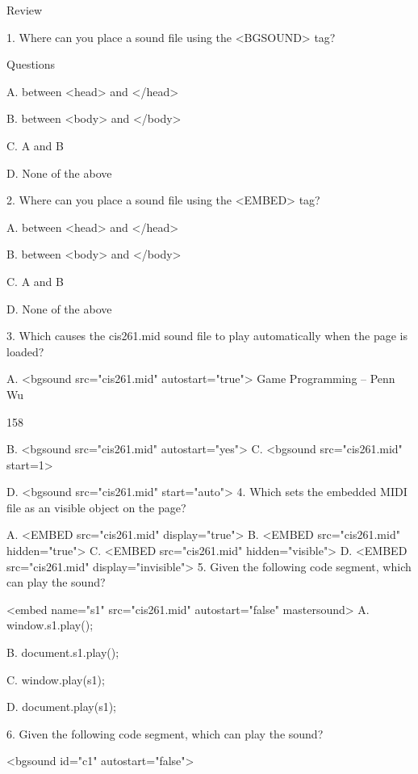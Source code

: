 \documentclass[
]{article}
\begin{document}
Review

1. Where can you place a sound file using the
\textless BGSOUND\textgreater{} tag?

Questions

A. between \textless head\textgreater{} and \textless/head\textgreater{}

B. between \textless body\textgreater{} and \textless/body\textgreater{}

C. A and B

D. None of the above

2. Where can you place a sound file using the
\textless EMBED\textgreater{} tag?

A. between \textless head\textgreater{} and \textless/head\textgreater{}

B. between \textless body\textgreater{} and \textless/body\textgreater{}

C. A and B

D. None of the above

3. Which causes the cis261.mid sound file to play automatically when the
page is loaded?

A. \textless bgsound src="cis261.mid" autostart="true"\textgreater{}
Game Programming -- Penn Wu

158

\protect\hypertarget{index_split_010.htmlux5cux23p159}{}{}B.
\textless bgsound src="cis261.mid" autostart="yes"\textgreater{} C.
\textless bgsound src="cis261.mid" start=1\textgreater{}

D. \textless bgsound src="cis261.mid" start="auto"\textgreater{} 4.
Which sets the embedded MIDI file as an visible object on the page?

A. \textless EMBED src="cis261.mid" display="true"\textgreater{} B.
\textless EMBED src="cis261.mid" hidden="true"\textgreater{} C.
\textless EMBED src="cis261.mid" hidden="visible"\textgreater{} D.
\textless EMBED src="cis261.mid" display="invisible"\textgreater{} 5.
Given the following code segment, which can play the sound?

\textless embed name="s1" src="cis261.mid" autostart="false"
mastersound\textgreater{} A. window.s1.play();

B. document.s1.play();

C. window.play(s1);

D. document.play(s1);

6. Given the following code segment, which can play the sound?

\textless bgsound id="c1" autostart="false"\textgreater{}
\end{document}
